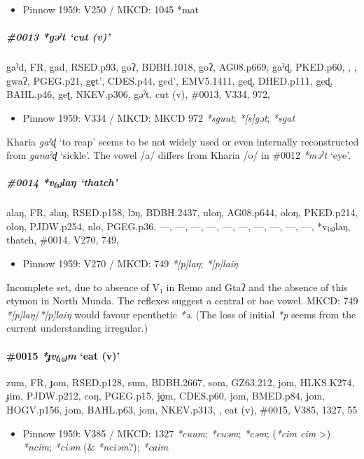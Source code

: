 \documentclass[a4paper,]{article}
\providecommand{\tightlist}{%
  \setlength{\itemsep}{0pt}\setlength{\parskip}{0pt}}
\let\oldparagraph\paragraph
\renewcommand{\paragraph}[1]{\oldparagraph{#1}\mbox{}}
\let\oldsubparagraph\subparagraph
\renewcommand{\subparagraph}[1]{\oldsubparagraph{#1}\mbox{}}
\begin{document}
\begin{itemize}
\tightlist
\item
  Pinnow 1959: V250 / MKCD: 1045 *mat
\end{itemize}

\subparagraph{\texorpdfstring{\#0013 \emph{*gəˀt} `cut
(v)'}{\#0013 *gəˀt cut (v)}}\label{gux259ux2c0t-cut-v}

gaˀd, FR, gad, RSED.p93, goʔ, BDBH.1018, goʔ, AG08.p669, gaˀɖ, PKED.p60,
, , gwaʔ, PGEG.p21, ge̠t', CDES.p44, ged', EMV5.1411, geɖ, DHED.p111,
geɖ, BAHL.p46, geʈ, NKEV.p306, gəˀt, cut (v), \#0013, V334, 972,

\begin{itemize}
\tightlist
\item
  Pinnow 1959: V334 / MKCD: MKCD 972 \emph{*sguut}; \emph{*{[}s{]}gət};
  \emph{*sgat}
\end{itemize}

Kharia \emph{gaˀɖ} `to reap' seems to be not widely used or even
internally reconstructed from \emph{ganaˀɖ} `sickle'. The vowel /a/
differs from Kharia /o/ in \#0012 \emph{*məˀt} `eye'.

\subparagraph{\texorpdfstring{\#0014 \emph{*v₍₉₎laŋ}
`thatch'}{\#0014 *v₍₉₎laŋ thatch}}\label{vlaux14b-thatch}

alaŋ, FR, əlaŋ, RSED.p158, lɔŋ, BDBH.2437, uloŋ, AG08.p644, oloŋ,
PKED.p214, oloŋ, PJDW.p254, nlo, PGEG.p36, ---, ---, ---, ---, ---, ---,
---, ---, ---, ---, *v₍₉₎laŋ, thatch, \#0014, V270, 749,

\begin{itemize}
\tightlist
\item
  Pinnow 1959: V270 / MKCD: 749 \emph{*{[}p{]}laŋ}; \emph{*{[}p{]}laiŋ}
\end{itemize}

Incomplete set, due to absence of V₁ in Remo and Gtaʔ and the absence of
this etymon in North Munda. The reflexes suggest a central or bac vowel.
MKCD: 749 \emph{*{[}p{]}laŋ}/\emph{*{[}p{]}laiŋ} would favour epenthetic
\emph{*ə}. (The loss of initial \emph{*p} seems from the current
understanding irregular.)

\paragraph{\texorpdfstring{\#0015 \emph{*ɟv₍₁₀₎m} `eat
(v)'}{\#0015 *ɟv₍₁₀₎m eat (v)}}\label{ux25fvm-eat-v}

zum, FR, ɟom, RSED.p128, sum, BDBH.2667, som, GZ63.212, jom, HLKS.K274,
ɟim, PJDW.p212, coŋ, PGEG.p15, jo̠m, CDES.p60, jom, BMED.p84, jom,
HOGV.p156, jom, BAHL.p63, jom, NKEV.p313, , eat (v), \#0015, V385, 1327,
55

\begin{itemize}
\tightlist
\item
  Pinnow 1959: V385 / MKCD: 1327 \emph{*cuum}; \emph{*cuəm};
  \emph{*cəm}; (\emph{*cim cim} \textgreater{}) \emph{*ncim};
  \emph{*ciəm} (\& \emph{*nciəm}?); \emph{*caim}
\end{itemize}
\end{document}
